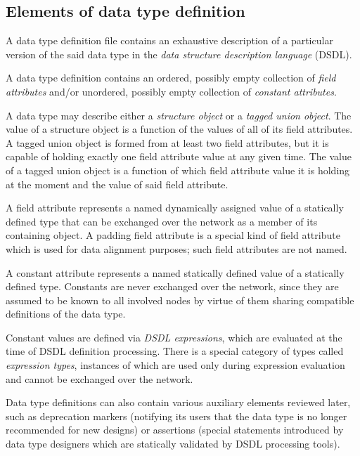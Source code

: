 \subsection{Elements of data type definition}\label{sec:dsdl_elements_of_data_type_definition}

A data type definition file contains an exhaustive description of a particular version of the said data type in the
\emph{data structure description language} (DSDL).

A data type definition contains an ordered, possibly empty collection of \emph{field attributes} and/or
unordered, possibly empty collection of \emph{constant attributes}.

A data type may describe either a \emph{structure object} or a \emph{tagged union object}.
The value of a structure object is a function of the values of all of its field attributes.
A tagged union object is formed from at least two field attributes,
but it is capable of holding exactly one field attribute value at any given time.
The value of a tagged union object is a function of which field attribute value
it is holding at the moment and the value of said field attribute.

A field attribute represents a named dynamically assigned value of a statically defined type
that can be exchanged over the network as a member of its containing object.
A padding field attribute is a special kind of field attribute which is used for data alignment purposes;
such field attributes are not named.

A constant attribute represents a named statically defined value of a statically defined type.
Constants are never exchanged over the network, since they are assumed to be known to all involved nodes
by virtue of them sharing compatible definitions of the data type.

Constant values are defined via \emph{DSDL expressions},
which are evaluated at the time of DSDL definition processing.
There is a special category of types called \emph{expression types},
instances of which are used only during expression evaluation
and cannot be exchanged over the network.

Data type definitions can also contain various auxiliary elements reviewed later,
such as deprecation markers (notifying its users that the data type is no longer recommended for new designs)
or assertions (special statements introduced by data type designers
which are statically validated by DSDL processing tools).

